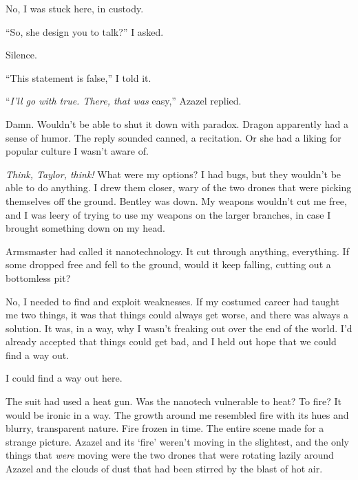 No, I was stuck here, in custody.



``So, she design you to talk?''  I asked.



Silence.



``This statement is false,'' I told it.



``\emph{I'll go with true.  There, that was} easy,'' Azazel replied.



Damn.  Wouldn't be able to shut it down with paradox.  Dragon apparently had a sense of humor.  The reply sounded canned, a recitation.  Or she had a liking for popular culture I wasn't aware of.



\emph{Think, Taylor, think!}  What were my options?  I had bugs, but they wouldn't be able to do anything.  I drew them closer, wary of the two drones that were picking themselves off the ground.  Bentley was down.  My weapons wouldn't cut me free, and I was leery of trying to use my weapons on the larger branches, in case I brought something down on my head.



Armsmaster had called it nanotechnology.  It cut through anything, everything.  If some dropped free and fell to the ground, would it keep falling, cutting out a bottomless pit?



No, I needed to find and exploit weaknesses.  If my costumed career had taught me two things, it was that things could always get worse, and there was always a solution.  It was, in a way, why I wasn't freaking out over the end of the world.  I'd already accepted that things could get bad, and I held out hope that we could find a way out.



I could find a way out here.



The suit had used a heat gun.  Was the nanotech vulnerable to heat?  To fire?  It would be ironic in a way.  The growth around me resembled fire with its hues and blurry, transparent nature.  Fire frozen in time.  The entire scene made for a strange picture.  Azazel and its `fire' weren't moving in the slightest, and the only things that \emph{were} moving were the two drones that were rotating lazily around Azazel and the clouds of dust that had been stirred by the blast of hot air.



